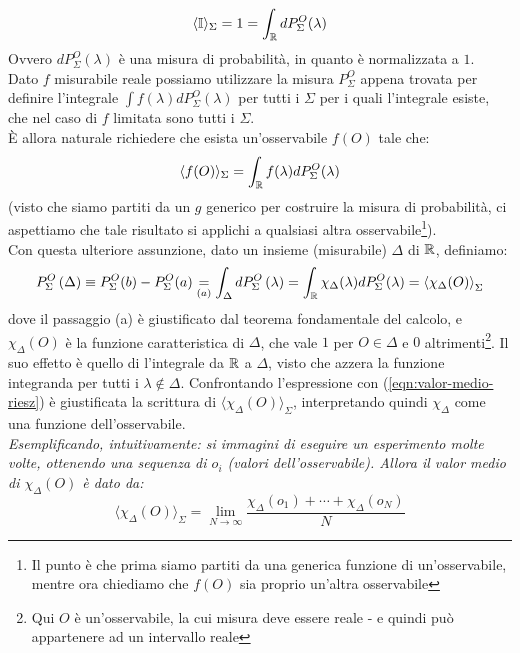 \documentclass[FisicaTeorica.tex]{subfiles}
\begin{document}
\[
\langle \mathbb{I}\rangle_\Sigma = 1 = \int_{\mathbb{R}} dP_\Sigma^O (\lambda)
\]
Ovvero $dP_\Sigma^O\left(\lambda\right)$ è una misura di probabilità, in quanto è normalizzata a $1$.\\%
Dato $f$ misurabile reale possiamo utilizzare la misura $P_\Sigma^O$ appena trovata per definire l'integrale
$\int f\left(\lambda\right) dP_\Sigma^O(\lambda)$ per tutti i $\Sigma$ per i quali l'integrale esiste, che nel caso di $f$ limitata sono tutti i $\Sigma$.\\
È allora naturale richiedere che esista un'osservabile $f(O)$ tale che: %
\[
\langle f(O)\rangle_\Sigma = \int_{\mathbb{R}} f(\lambda) dP_\Sigma^O(\lambda)
\]
(visto che siamo partiti da un $g$ generico per costruire la misura di probabilità, ci aspettiamo che tale risultato si applichi a qualsiasi altra osservabile\footnote{Il punto è che prima siamo partiti da una generica funzione di un'osservabile, mentre ora chiediamo che $f(O)$ sia proprio un'altra osservabile}).\\
Con questa ulteriore assunzione, dato un insieme (misurabile) $\Delta$ di $\mathbb{R}$, definiamo:
\begin{align}
P_\Sigma^O\left(\Delta\right) \equiv P_\Sigma^O(b) - P_\Sigma^O(a) \underset{(a)}{=} \int_{\Delta}{dP_\Sigma^O\left(\lambda\right)=
\int_{\mathbb{R}} \chi_\Delta(\lambda) dP_\Sigma^O(\lambda) = 
\left\langle\chi_\Delta(O)\right\rangle_\Sigma}
\label{eqn:Psigmadelta}
\end{align} 
dove il passaggio (a) è giustificato dal teorema fondamentale del calcolo, e $\chi_\Delta(O)$ è la funzione caratteristica di $\Delta$, che vale $1$ per $O \in \Delta$ e $0$ altrimenti\footnote{Qui $O$ è un'osservabile, la cui misura deve essere reale - e quindi può appartenere ad un intervallo reale}. Il suo effetto è quello di  l'integrale da $\mathbb{R}$ a $\Delta$, visto che azzera la funzione integranda per tutti i $\lambda \notin \Delta$. Confrontando l'espressione con (\ref{eqn:valor-medio-riesz}) è giustificata la scrittura di $\langle \chi_\Delta(O)\rangle_\Sigma$, interpretando quindi $\chi_\Delta$ come una funzione dell'osservabile.\\
\textit{Esemplificando, intuitivamente: si immagini di eseguire un esperimento molte volte, ottenendo una sequenza di $o_i$ (valori dell'osservabile). Allora il valor medio di $\chi_\Delta(O)$ è dato da:}
\[
\langle \chi_\Delta(O)\rangle_\Sigma = \lim_{N\to \infty} \frac{\chi_\Delta(o_1) + \cdots + \chi_\Delta(o_N)}{N}
\]
\end{document}
